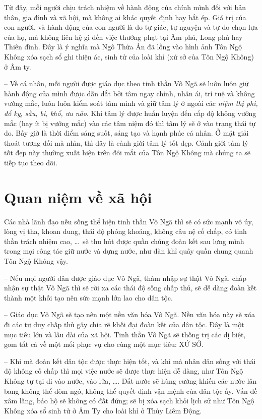 Từ đây, mỗi người chịu trách nhiệm về hành động của chính mình đối với bản thân, gia đình và xã hội, mà không ai khác quyết định hay bắt ép. Giá trị của con người, và hành động của con người là do tự giác, tự nguyện và tự do chọn lựa của họ, mà không liên hệ gì đến việc thưởng phạt tại Âm phủ, Long phủ hay Thiên đình. Đây là ý nghĩa mà Ngô Thừa Ân đã lồng vào hình ảnh Tôn Ngộ Không xóa sạch sổ ghi thiện ác, sinh tử của loài khỉ (xứ sở của Tôn Ngộ Không) ở Âm ty.

-- Về cá nhân, mỗi người được giáo dục theo tinh thần Vô Ngã sẽ luôn luôn giữ hành động của mình được dẫn dắt bởi tâm ngay chính, nhân ái, trí tuệ và không vướng mắc, luôn luôn kiểm soát tâm mình và giữ tâm lý ở ngoài các \emph{niệm thị phi, đố kỵ, sầu, bi, khổ, ưu não}. Khi tâm lý được huấn luyện đến cấp độ không vướng mắc (hay ít bị vướng mắc) vào các tâm niệm đó thì tâm lý sẽ ở vào trạng thái tự do. Bấy giờ là thời điểm sáng suốt, sáng tạo và hạnh phúc cá nhân. Ở mặt giải thoát tương đối mà nhìn, thì đây là cảnh giới tâm lý tốt đẹp. Cảnh giới tâm lý tốt đẹp này thường xuất hiện trên đôi mắt của Tôn Ngộ Không mà chúng ta sẽ tiếp tục theo dõi.


\section{Quan niệm về xã hội} %
\label{sec:3_xa_hoi}

Các nhà lãnh đạo nếu sống thể hiện tinh thần Vô Ngã thì sẽ có sức mạnh vô úy, lòng vị tha, khoan dung, thái độ phóng khoáng, không câu nệ cố chấp, có tinh thần trách nhiệm cao, \ldots ~sẽ thu hút được quần chúng đoàn kết sau lưng mình trong mọi công tác giữ nước và dựng nước, như đàn khỉ quây quần chung quanh Tôn Ngộ Không vậy.

-- Nếu mọi người dân được giáo dục Vô Ngã, thâm nhập sự thật Vô Ngã, chấp nhận sự thật Vô Ngã thì sẽ rời xa các thái độ sống chấp thủ, sẽ dễ dàng đoàn kết thành một khối tạo nên sức mạnh lớn lao cho dân tộc.

-- Giáo dục Vô Ngã sẽ tạo nên một nền văn hóa Vô Ngã. Nền văn hóa này sẽ xóa đi các tư duy chấp thủ gây chia rẽ khối đại đoàn kết của dân tộc. Đây là một mục tiêu lớn và lâu dài của xã hội. Tinh thần Vô Ngã sẽ thống trị các dị biệt, gom tất cả về một mối phục vụ cho cùng một mục tiêu: XỨ SỞ.

-- Khi mà đoàn kết dân tộc được thực hiện tốt, và khi mà nhân dân sống với thái độ không cố chấp thì mọi việc nước sẽ được thực hiện dễ dàng, như Tôn Ngộ Không tự tại đi vào nước, vào lửa, \ldots. Đất nước sẽ hùng cường khiến các nước lân bang không thể dòm ngó, không thể quyết định vận mệnh của dân tộc ấy. Vấn đề xâm lăng, bảo hộ sẽ không có đất đứng; sẽ bị xóa sạch khỏi lịch sử như Tôn Ngộ Không xóa sổ sinh tử ở Âm Ty cho loài khỉ ở Thủy Liêm Động.

